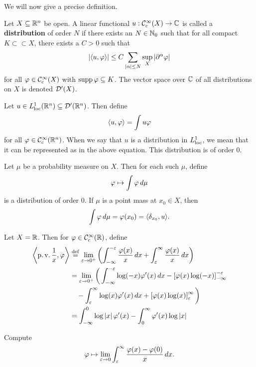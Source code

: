 We will now give a precise definition.

\begin{defn}[Distributions in $\RR^n$]
  Let $X\subseteq\mathbb{R}^n$ be open.
  A linear functional $u: \mathcal{C}_c^\infty(X) \to \mathbb{C}$ is called a \textbf{distribution} of order $N$ if there exists an $N\in\mathbb{N}_0$ such that for all compact $K \subset\subset X$, there exists a $C>0$ such that
  \[ \left\lvert {\left\langle u,\varphi\right\rangle} \right\rvert \leq C\sum_{\left\lvert \alpha \right\rvert\leq N} \sup_X \left\lvert \partial^\alpha\varphi \right\rvert \]
  for all $\varphi\in\mathcal{C}_c^\infty(X)$ with $\operatorname{supp}\varphi\subseteq K$.
  The vector space over $\mathbb{C}$ of all distributions on $X$ is denoted $\mathcal{D}'(X)$.
\end{defn}

\begin{exam}
  \lv
  \begin{enum}
    \io
    Let $u\in L_{\operatorname{loc}}^1(\mathbb{R}^n)\subseteq\mathcal{D}'(\mathbb{R}^n)$.
    Then define
    \[ {\left\langle u,\varphi \right\rangle} = \int u\varphi \]
    for all $\varphi\in\mathcal{C}_c^\infty(\mathbb{R}^n)$.
    When we say that $u$ is a distribution in $L_{\operatorname{loc}}^1$, we mean that it can be represented as in the above equation.
    This distribution is of order $0$.

    \io
    Let $\mu$ be a probability measure on $X$.
    Then for each such $\mu$, define
    \[ \varphi \mapsto \int \varphi \, d\mu \]
    is a distribution of order $0$.
    If $\mu$ is a point mass at $x_0 \in X$, then
    \[ \int \varphi \, d\mu = \varphi(x_0) = {\left\langle \delta_{x_0},u \right\rangle}. \]

    \io
    Let $X=\mathbb{R}$.
    Then for $\varphi\in\mathcal{C}_c^\infty(\mathbb{R})$, define
    \begin{align*}
      {\left\langle \operatorname{p.v.}\frac1x,\varphi\right\rangle} &\overset{\mathrm{def}}{=} \lim_{\varepsilon\to0^+} \left( \int_{-\infty}^{-\varepsilon} \frac{\varphi(x)}{x}\, dx + \int_\varepsilon^\infty \frac{\varphi(x)}{x} \, dx \right) \\
      &= \lim_{\varepsilon\to0^+} \bigg( \int_{-\infty}^{-\varepsilon} \log(-x)\varphi'(x)\, dx - \left[ \varphi(x)\log(-x) \right]_{-\infty}^{-\varepsilon} \\
      &\quad - \int_\varepsilon^\infty \log(x)\varphi'(x) \, dx + \left[ \varphi(x)\log(x) \right]_\varepsilon^\infty \bigg) \\
      &= \int_{-\infty}^0 \log\left\lvert x \right\rvert\varphi'(x) - \int_0^\infty \varphi'(x)\log\left\lvert x \right\rvert
    \end{align*}
    
    \io
    Compute
    \[ \varphi \mapsto \lim_{\varepsilon\to0} \int_\varepsilon^\infty \frac{\varphi(x)-\varphi(0)}{x} \, dx. \]
  \end{enum}
\end{exam}
